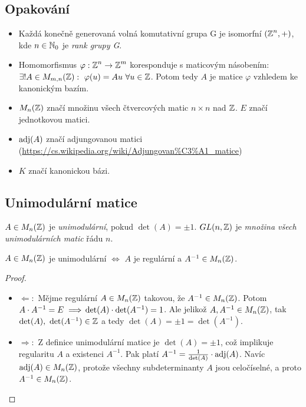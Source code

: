 \subsection*{Opakování}
\begin{itemize}
    \item Každá konečně generovaná volná komutativní grupa G je isomorfní $(\operatorname{\mathbb{Z}}^n, +)$, kde $n \in \operatorname{\mathbb{N}}_0$ je \emph{rank grupy G}.
    \item Homomorfismus $\varphi: \operatorname{\mathbb{Z}}^n \rightarrow \operatorname{\mathbb{Z}}^m$ koresponduje s maticovým násobením: $\exists ! A \in M_{m,n}(\Z): \ \varphi(u) = Au \ \forall u \in \Z$. Potom tedy $A$ je matice $\varphi$ vzhledem ke kanonickým bazím.
    \item $M_n(\operatorname{\mathbb{Z}})$ značí množinu všech čtvercových matic $n \times n$ nad $\operatorname{\mathbb{Z}}$. $E$ značí jednotkovou matici.
    \item $\operatorname{adj}(A)$ značí adjungovanou matici (\url{https://cs.wikipedia.org/wiki/Adjungovan%C3%A1_matice})
    \item $K$ značí kanonickou bázi.
\end{itemize}

\subsection{Unimodulární matice}
\begin{definition}
    $A \in M_n(\operatorname{\mathbb{Z}})$ je \emph{unimodulární}, pokud $\det(A) = \pm 1$. $GL(n, \operatorname{\mathbb{Z}})$ je \emph{množina všech unimodulárních matic} řádu $n$.
\end{definition}

\begin{lemma}\label{lemma3_11}
    $A \in M_n(\operatorname{\mathbb{Z}})$ je unimodulární $\iff $ $A$ je regulární a $A^{-1} \in M_n(\operatorname{\mathbb{Z}})$.
\end{lemma}
\begin{proof}
\phantom{}
    \begin{itemize}[label={}]
    \item $\Leftarrow:$
    Mějme regulární $A \in M_n(\operatorname{\mathbb{Z}})$ takovou, že $A^{-1} \in M_n(\operatorname{\mathbb{Z}})$. Potom $A\cdot A^{-1} = E \implies \\ \det(A) \cdot \det(A^{-1}) = 1$. Ale jelikož $A, A^{-1} \in M_n(\operatorname{\mathbb{Z}})$, tak $\det(A), \ \det(A^{-1})\in \Z$ a tedy $\det(A) = \pm 1 = \det(A^{-1})$.

    \item $\Rightarrow:$
    Z definice unimodulární matice je $\det(A) =\pm 1$, což implikuje regularitu $A$ a existenci $A^{-1}$. Pak platí $A^{-1} = \frac{1}{\det(A)} \cdot \operatorname{adj}(A)$. Navíc $\operatorname{adj}(A) \in M_n(\operatorname{\mathbb{Z}})$, protože všechny subdeterminanty $A$ jsou celočíselné, a proto $A^{-1} \in M_n(\operatorname{\mathbb{Z}})$.
    \end{itemize}
\end{proof}



